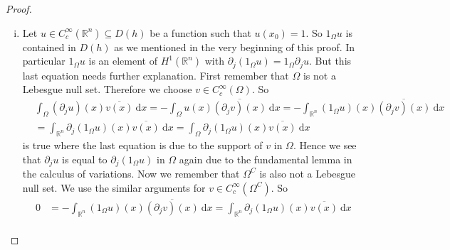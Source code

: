\documentclass[10pt,a4paper]{amsart}
\def\R{\mathbb{R}}
\begin{document}
\begin{proof}
\begin{enumerate}[i.)]
Let $\R^{n} = \Omega_{1}$ be true. We choose a compact set $K \subseteq \Omega$ such that $\lambda(K) > 0$. This is possible
since $\Omega$ is not a pure point set in $\R^{n}$. For every $x \in K$ there exists a $r = r(x) > 0$ such that 
$$
\lambda (B(x,r) \cap \Omega)=0
$$ 
since $K \subseteq \Omega \subseteq \R^{n}=\Omega_{1}$. By the compactness of $K$ we conclude that 
$$
K \subseteq B(x_{1},r_{1}) \cup \dots \cup B(x_{m},r_{m}) 
$$
holds for some $x_{1}, \dots, x_{m} \in K$ where $r_{j}$ are given by $\Omega_{1}$. But then
$$
0 < \lambda(K) = \lambda(K \cap \Omega) \leq \sum_{j=1}^{m} \lambda \bigl( B(x_{j},r_{j}) \cap \Omega \bigr) = 0
$$
is obviously a contradiction. Using the same argumentation for $\R^{n} = \Omega_{2}$ leads to a contradiction as well. 
Hence there must exist a $x_{0} \in \R^{n}$ such that neither $\Omega \cap B(x_{0},r)$ nor $\Omega^{C} \cap B(x_{0},r)$ 
is a Lebesgue null set for any radius $r>0$.
\item Let $u \in C_{c}^{\infty}(\R^{n}) \subseteq D(h)$ be a function such that $u(x_{0}) = 1$. 
So $1_{\Omega} u$ is contained in $D(h)$ as we mentioned in the very beginning of this proof. 
In particular $1_{\Omega} u$ is an element of $H^{1}(\R^{n})$ with 
$\partial_{j} (1_{\Omega} u) = 1_{\Omega} \partial_{j}u$. But this last equation needs further explanation. First remember
that $\Omega$ is not a Lebesgue null set. Therefore we choose $v \in C_{c}^{\infty}(\Omega)$. So
\begin{align*}
& \int_{\Omega} (\partial_{j} u)(x) \overline{v(x)} \ \mathrm{d}x = - \int_{\Omega} u(x) \overline{(\partial_{j} v)(x)} \ \mathrm{d}x
 =  - \int_{\R^{n}} (1_{\Omega} u)(x) \overline{(\partial_{j} v)(x)} \ \mathrm{d}x \\
& = \int_{\R^{n}} \partial_{j}(1_{\Omega} u)(x) \overline{v(x)} \ \mathrm{d}x
 = \int_{\Omega} \partial_{j}(1_{\Omega} u)(x) \overline{v(x)} \ \mathrm{d}x
\end{align*}
is true where the last equation is due to the support of $v$ in $\Omega$. Hence we see that $\partial_{j} u$ is equal to 
$\partial_{j}(1_{\Omega} u)$ in $\Omega$ again due to the fundamental lemma in the calculus of variations. Now we remember 
that $\Omega^{C}$ is also not a Lebesgue null set. We
use the similar arguments for $v \in C_{c}^{\infty}(\Omega^{C})$. So
\begin{align*}
0 & = - \int_{\R^{n}} (1_{\Omega} u)(x) \overline{(\partial_{j} v)(x)} \ \mathrm{d}x = 
\int_{\R^{n}} \partial_{j}(1_{\Omega} u)(x) \overline{v(x)} \ \mathrm{d}x \\

\end{align*}
\end{enumerate}
\end{proof}
\end{document}
